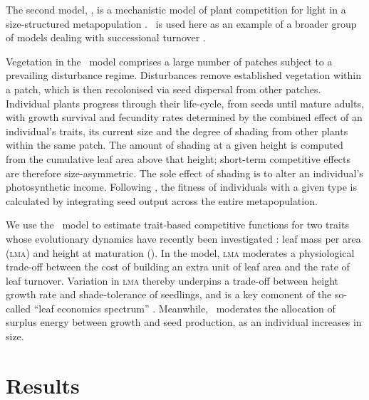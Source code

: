 \documentclass[a4paper,11pt]{article}
\begin{document}
The second model, \plant, is a mechanistic model of plant competition
for light in a size-structured metapopulation \citep{Falster-2011,
  Falster-2015}. \plant\ is used here as an example of a broader group
of models dealing with successional turnover
\citep{Huston-1987,Kohyama-1993,Moorcroft-2001,Falster-2011}.

Vegetation in the \plant\ model comprises a large number of patches subject
to a prevailing disturbance regime.  Disturbances remove established
vegetation within a patch, which is then recolonised via seed
dispersal from other patches.  Individual plants progress through
their life-cycle, from seeds until mature adults, with growth survival
and fecundity rates determined by the combined effect of an
individual's traits, its current size and the degree of shading from
other plants within the same patch. The amount of shading at a given
height is computed from the cumulative leaf area above that height;
short-term competitive effects are therefore size-asymmetric. The sole
effect of shading is to alter an individual's photosynthetic
income. Following \citep{Falster-2015}, the fitness of individuals
with a given type is calculated by integrating seed output across the
entire metapopulation.

We use the \plant\ model to estimate trait-based competitive functions
for two traits whose evolutionary dynamics have recently been
investigated \citep{Falster-2015}: leaf mass per area (\textsc{lma})
and height at maturation (\hmat). In the model, \textsc{lma} moderates
a physiological trade-off between the cost of building an extra unit
of leaf area and the rate of leaf turnover.  Variation in \textsc{lma}
thereby underpins a trade-off between height growth rate and
shade-tolerance of seedlings, and is a key comonent of the so-called
``leaf economics spectrum'' \citep{Wright-2004}. Meanwhile, \hmat\
moderates the allocation of surplus energy between growth and seed
production, as an individual increases in size.


\section{Results}

%
\end{document}

